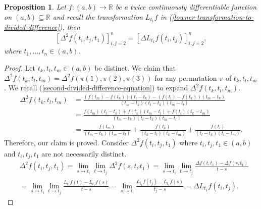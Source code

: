 \documentclass[12pt,a4paper]{amsart}
\newtheorem{proposition}[theorem]{Proposition}
\theoremstyle{definition}
\begin{document}
	\begin{proposition}\label{second-divided-difference-positivity-implies-first-derivative-positive}
		Let  $f: (a, b) \rightarrow \mathbb{R}$ be a twice continuously differentiable function on $(a, b) \subseteq \mathbb{R}$ and recall the transformation $L_{t_1}f$ in (\ref{lowner-transformation-to-divided-difference}), then
		\[ [\Delta^{2}f(t_i, t_j, t_1)]_{i, j = 2}^{n} = [\Delta L_{t_1}f(t_i, t_j)]_{i, j = 2}^{n},\]
		where $t_1, \ldots, t_n \in (a, b)$.
	\end{proposition}
	\begin{proof}
		Let $t_k, t_l, t_m \in (a,b)$  be distinct. We claim that $ \Delta^{2} f(t_k, t_l, t_m) = \Delta^{2} f(\pi(1), \pi(2), \pi(3))$ for any permutation $\pi$ of $t_k, t_l, t_m$. We recall (\ref{second-divided-difference-equation}) to expand $\Delta^{2}f(t_k, t_l, t_m)$.
		\begin{align*}
			\Delta^{2}f(t_k, t_l, t_m) &= \frac{(f(t_m) - f(t_k))(t_l - t_k) -  (f(t_l) - f(t_k))(t_m-t_k)}{(t_m - t_k)(t_l-t_k)(t_m - t_l)} \\
			&= \frac{f(t_m)(t_l - t_k) + f(t_k)(t_m-t_l) + f(t_l)(t_k - t_m)}{(t_m - t_k)(t_l-t_k)(t_m - t_l)} \\
			&= \frac{f(t_m)}{(t_m - t_k)(t_m - t_l)} + \frac{f(t_k)}{(t_k - t_l)(t_k - t_m)} + \frac{f(t_l)}{(t_l - t_k)(t_l - t_m)}.
		\end{align*}
		Therefore, our claim is proved. Consider $\Delta^{2} f(t_i, t_j, t_1)$ where $t_i, t_j, t_1 \in (a,b)$ and $t_i, t_j, t_1$ are not necessarily distinct. 
		\begin{align*}
			&\Delta^{2} f(t_i, t_j, t_1) = \lim_{s \rightarrow t_i} \lim_{t \rightarrow t_j} \Delta^{2} f(s, t, t_1) = \lim_{s \rightarrow t_i} \lim_{t \rightarrow t_j} \frac{\Delta f(t, t_1) - \Delta f(s, t_1) }{t-s} \\
			&= \lim_{s \rightarrow t_i} \lim_{t \rightarrow t_j} \frac{L_{t_1}f(t) - L_{t_1}f(s)}{t - s} 
			= \lim_{s \rightarrow t_i} \frac{L_{t_1}f(t_j) - L_{t_1}f(s)}{t_j - s} =  \Delta L_{t_1}f(t_i, t_j).
		\end{align*}
	\end{proof}
	
\end{document}
